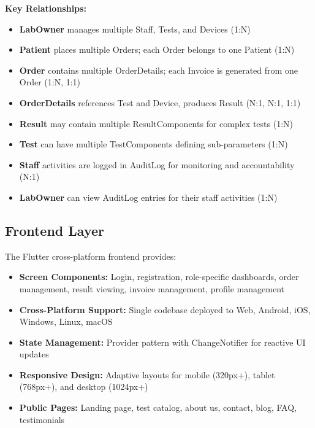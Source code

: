 \documentclass[12pt, a4paper]{report}
\begin{document}
\textbf{Key Relationships:}
\begin{itemize}
    \item \textbf{LabOwner} manages multiple Staff, Tests, and Devices (1:N)
    \item \textbf{Patient} places multiple Orders; each Order belongs to one Patient (1:N)
    \item \textbf{Order} contains multiple OrderDetails; each Invoice is generated from one Order (1:N, 1:1)
    \item \textbf{OrderDetails} references Test and Device, produces Result (N:1, N:1, 1:1)
    \item \textbf{Result} may contain multiple ResultComponents for complex tests (1:N)
    \item \textbf{Test} can have multiple TestComponents defining sub-parameters (1:N)
    \item \textbf{Staff} activities are logged in AuditLog for monitoring and accountability (N:1)
    \item \textbf{LabOwner} can view AuditLog entries for their staff activities (1:N)
\end{itemize}

\subsection{Frontend Layer}
The Flutter cross-platform frontend provides:
\begin{itemize}
    \item \textbf{Screen Components:} Login, registration, role-specific dashboards, order management, result viewing, invoice management, profile management
    \item \textbf{Cross-Platform Support:} Single codebase deployed to Web, Android, iOS, Windows, Linux, macOS
    \item \textbf{State Management:} Provider pattern with ChangeNotifier for reactive UI updates
    \item \textbf{Responsive Design:} Adaptive layouts for mobile (320px+), tablet (768px+), and desktop (1024px+)
    \item \textbf{Public Pages:} Landing page, test catalog, about us, contact, blog, FAQ, testimonials
\end{itemize}
\end{document}

